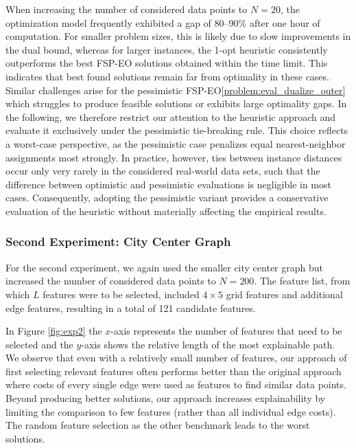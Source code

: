 \documentclass[11pt, a4paper]{article}
\newcommand{\fspeo}{FSP-EO\xspace}
\newcommand{\MHil}[1]{\todo[color=gray, textcolor=yellow, inline, author=MH]{#1}}
\begin{document}
When increasing the number of considered data points to $N=20$, the optimization model frequently exhibited a gap of 80--90\% after one hour of computation. For smaller problem sizes, this is likely due to slow improvements in the dual bound, whereas for larger instances, the 1-opt heuristic consistently outperforms the best \fspeo solutions obtained within the time limit. This indicates that best found solutions remain far from optimality in these cases. Similar challenges arise for the pessimistic \fspeo \eqref{problem:eval_dualize_outer}  which struggles to produce feasible solutions or exhibits large optimality gaps.
In the following, we therefore restrict our attention to the heuristic approach and evaluate it exclusively under the pessimistic tie-breaking rule. This choice reflects a worst-case perspective, as the pessimistic case penalizes equal nearest-neighbor assignments most strongly. In practice, however, ties between instance distances occur only very rarely in the considered real-world data sets, such that the difference between optimistic and pessimistic evaluations is negligible in most cases. Consequently, adopting the pessimistic variant provides a conservative evaluation of the heuristic without materially affecting the empirical results.


\subsubsection{Second Experiment: City Center Graph}
For the second experiment, we again used the smaller city center graph but increased the number of considered data points to $N=200$. The feature list, from which $L$ features were to be selected, included $4 \times 5$ grid features and additional edge features, resulting in a total of 121 candidate features.

In Figure \ref{fig:exp2} the $x$-axis represents the number of features that need to be selected and the $y$-axis shows the relative length of the most explainable path. We observe that even with a relatively
small number of features, our approach of first selecting relevant features often performs better than the original approach where costs of every single edge were used as features to find similar data points. Beyond producing better solutions, our approach increases explainability by limiting the comparison to few features (rather than all individual edge costs).
The random feature selection as the other benchmark leads to the worst solutions.
\end{document}
